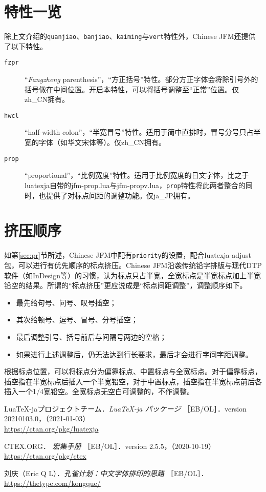 \documentclass[a4paper , zihao=-4 , fontset=adobe , punct=zh_CN/kaiming]{ctexart}
\begin{document}
\section{特性一览}
除上文介绍的\+\verb|quanjiao|、\verb|banjiao|、\verb|kaiming|与\+\verb|vert|特性外，\textsf{Chinese JFM}还提供了以下特性。

\begin{description}
    \item[\texttt{fzpr}] “\textit{Fangzheng} parenthesis”，“方正括号”特性。部分方正字体会将除引号外的括号做在中间位置。开启本特性，可以将括号调整至“正常”位置。仅\textsf{zh\_CN}拥有。
    \item[\texttt{hwcl}] “half-width colon”，“半宽冒号”特性。适用于简中直排时，冒号分号只占半宽的字体（如华文宋体等）。仅\textsf{zh\_CN}拥有。
    \item[\texttt{prop}] “proportional”，“比例宽度”特性。适用于比例宽度的日文字体，比之于\textsf{lua\-texja}自带的\textsf{jfm-prop.lua}与\textsf{jfm-propv.lua}，\verb|prop|特性将此两者整合的同时，也提供了对标点间距的调整功能。仅\textsf{ja\_JP}拥有。
\end{description}

\section{挤压顺序}
如第\ref{sec:pr}节所述，\textsf{Chinese JFM}中配有\+\verb|priority|的设置，配合\textsf{luatexja-adjust}包，可以进行有优先顺序的标点挤压。\textsf{Chinese JFM}沿袭传统铅字排版与现代DTP软件（如InDesign等）的习惯，认为标点只占半宽，全宽标点是半宽标点加上半宽铅空的结果。所谓的“标点挤压”更应说成是“标点间距调整”，调整顺序如下。
\begin{itemize}
    \item 最先给句号、问号、叹号插空；
    \item 其次给顿号、逗号、冒号、分号插空；
    \item 最后调整引号、括号前后与间隔号两边的空格；
    \item 如果进行上述调整后，仍无法达到行长要求，最后才会进行字间字距调整。
\end{itemize}

根据标点位置，可以将标点分为偏靠标点、中置标点与全宽标点。对于偏靠标点，插空指在半宽标点后插入一个半宽铅空，对于中置标点，插空指在半宽标点前后各插入一个1/4宽铅空。全宽标点无空白可调整的，不作调整。

\nocite{*}
\begin{thebibliography}{9}
 Lua\TeX-jaプロジェクトチーム．\textit{Lua\TeX-ja パッケージ} ［EB/OL］．version 20210103.0，（2021-01-03）\\\mbox{}
\hfill\url{https://ctan.org/pkg/luatexja}

 CTEX.ORG．\textit{\CTeX{} 宏集手册} ［EB/OL］．version 2.5.5，（2020-10-19）\\\mbox{}
\hfill\url{https://ctan.org/pkg/ctex}

 刘庆（Eric Q L）．\textit{孔雀计划：中文字体排印的思路} ［EB/OL］．\\\mbox{}
\hfill\url{https://thetype.com/kongque/}
\end{thebibliography}
\end{document}

